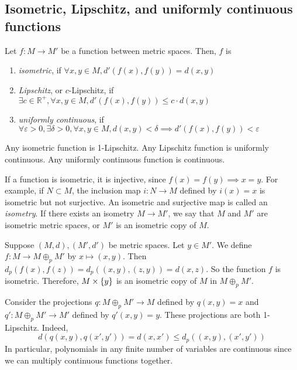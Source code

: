 \subsection{Isometric, Lipschitz, and uniformly continuous functions}
\begin{definition}
	Let \( f \colon M \to M' \) be a function between metric spaces.
	Then, \( f \) is
	\begin{enumerate}
		\item \textit{isometric}, if \( \forall x,y \in M, d'(f(x),f(y)) = d(x,y) \)
		\item \textit{Lipschitz}, or \( c \)-Lipschitz, if \( \exists c \in \mathbb R^+, \forall x,y \in M, d'(f(x),f(y)) \leq c\cdot d(x,y) \)
		\item \textit{uniformly continuous}, if \( \forall \varepsilon > 0, \exists \delta > 0, \forall x,y \in M, d(x,y) < \delta \implies d'(f(x), f(y)) < \varepsilon \)
	\end{enumerate}
\end{definition}
\begin{remark}
	Any isometric function is 1-Lipschitz.
	Any Lipschitz function is uniformly continuous.
	Any uniformly continuous function is continuous.
\end{remark}
\begin{remark}
	If a function is isometric, it is injective, since \( f(x) = f(y) \implies x = y \).
	For example, if \( N \subset M \), the inclusion map \( i \colon N \to M \) defined by \( i(x) = x \) is isometric but not surjective.
	An isometric and surjective map is called an \textit{isometry}.
	If there exists an isometry \( M \to M' \), we say that \( M \) and \( M' \) are isometric metric spaces, or \( M' \) is an isometric copy of \( M \).
\end{remark}
\begin{example}
	Suppose \( (M, d), (M', d') \) be metric spaces.
	Let \( y \in M' \).
	We define \( f \colon M \to M \oplus_p M' \) by \( x \mapsto (x,y) \).
	Then \( d_p(f(x),f(z)) = d_p((x,y), (z,y)) = d(x,z) \).
	So the function \( f \) is isometric.
	Therefore, \( M \times \qty{ y } \) is an isometric copy of \( M \) in \( M \oplus_p M' \).
\end{example}
\begin{example}
	Consider the projections \( q \colon M \oplus_p M' \to M \) defined by \( q(x,y) = x \) and \( q' \colon M \oplus_p M' \to M' \) defined by \( q'(x,y) = y \).
	These projections are both 1-Lipschitz.
	Indeed,
	\[
		d(q(x,y), q(x',y')) = d(x,x') \leq d_p((x,y), (x',y'))
	\]
	In particular, polynomials in any finite number of variables are continuous since we can multiply continuous functions together.
\end{example}

